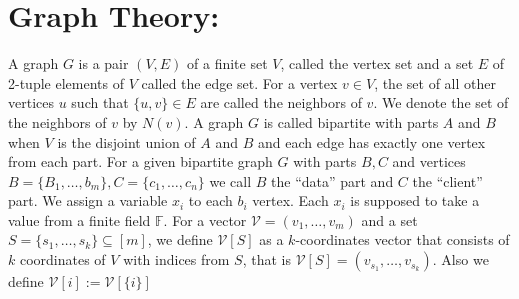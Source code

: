 \section{Graph Theory:}
A graph $G$ is a pair $(V, E)$ of a finite set $V$, called the vertex set and a set $E$ of 2-tuple elements of $V$ called the edge set. For a vertex $v\in V$, the set of all other vertices $u$ such that $\{u,v\}\in E$ are called the neighbors of $v$. We denote the set of the neighbors of $v$ by $N(v)$. A graph $G$ is called bipartite with parts $A$ and $B$ when $V$ is the disjoint union of $A$ and $B$ and each edge has exactly one vertex from each part. For a given bipartite graph $G$ with parts $B, C$ and vertices $B = \{B_1, \ldots, b_m\}, C = \{c_1, \ldots, c_n\}$ we call $B$ the ``data'' part and $C$ the ``client'' part. We assign a variable $x_i$ to each $b_i$ vertex. Each $x_i$ is supposed to take a value from a finite field $\mathbb{F}$.  
For a vector $\mathcal{V} = (v_1, \ldots, v_m)$ and a set $S = \{s_1, \ldots, s_k\} \subseteq [m]$, we define $\mathcal{V} [S]$ as a $k$-coordinates vector that consists of $k$ coordinates of $V$ with indices from $S$, that is  $\mathcal{V} [S] = (v_{s_1}, \ldots, v_{s_k})$. Also we define $\mathcal{V} [i] := \mathcal{V} [{\{i\}}]$
